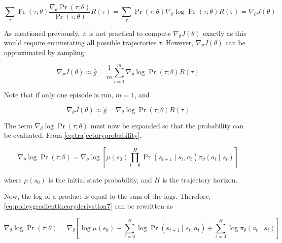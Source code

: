 \documentclass[acmlarge,screen]{acmart}
\begin{document}
\begin{equation}
  \sum_{\tau} \Pr (\tau; \theta) \frac{\nabla_\theta \Pr (\tau; \theta)}{\Pr (\tau; \theta)} R(\tau) = \sum_{\tau} \Pr (\tau; \theta) \nabla_\theta \log \Pr (\tau; \theta) R(\tau) = \nabla_\theta J(\theta)
\label{eq:policygradienttheoryderivation6}
\end{equation}

As mentioned previously, it is not practical to compute $\nabla_\theta J(\theta)$ exactly as this would require enumerating all possible trajectories $\tau$.
However, $\nabla_\theta J(\theta)$ can be approximated by sampling:

\begin{equation}
  \nabla_\theta J(\theta) \approx \hat{g} = \frac{1}{m} \sum_{i=1}^m \nabla_\theta \log \Pr (\tau; \theta) R(\tau)
\label{eq:policygradienttheoryderivation6a}
\end{equation}

\noindent Note that if only one episode is run, $m = 1$, and

\begin{equation}
  \nabla_\theta J(\theta) \approx \hat{g} = \nabla_\theta \log \Pr (\tau; \theta) R(\tau)
\label{eq:policygradienttheoryderivation6b}
\end{equation}


The term $\nabla_\theta \log \Pr (\tau; \theta)$ must now be expanded so that the probability can be evaluated.
From \ref{eq:trajectoryprobability},

\begin{equation}
  \nabla_\theta \log \Pr (\tau; \theta) = \nabla_\theta \log \left[ \mu(s_0) \prod_{t=0}^H  \Pr(s_{t+1} \mid s_t, a_t) \pi_\theta (a_t \mid s_t)   \right]    
\label{eq:policygradienttheoryderivation7}
\end{equation}

\noindent where $\mu(s_0)$ is the initial state probability, and $H$ is the trajectory horizon.

Now, the log of a product is equal to the sum of the logs.  Therefore, \ref{eq:policygradienttheoryderivation7} can be rewritten as

\begin{equation}
  \nabla_\theta \log \Pr (\tau; \theta) = \nabla_\theta \left[ \log \mu(s_0) + \sum_{t=0}^H \log \Pr(s_{t+1} \mid s_t, a_t) + \sum_{t=0}^H \log \pi_\theta (a_t \mid s_t)  \right]
\label{eq:policygradienttheoryderivation8}
\end{equation}
\end{document}

